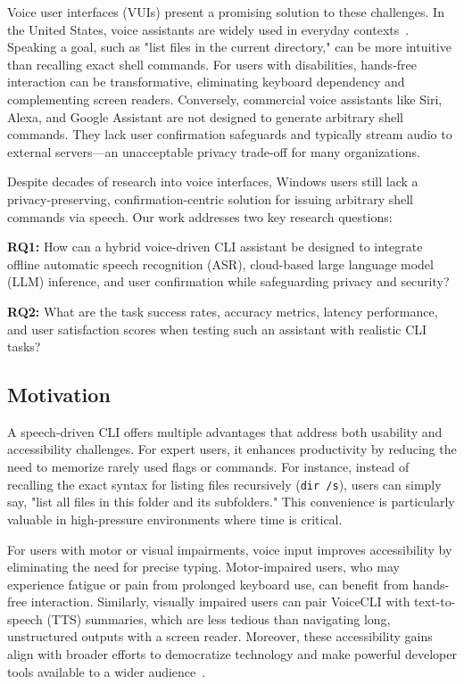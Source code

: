 \documentclass[a4paper,12pt]{article}
\begin{document}
Voice user interfaces (VUIs) present a promising solution to these challenges. In the United States, voice assistants are widely used in everyday contexts~\cite{ref8}. Speaking a goal, such as "list files in the current directory," can be more intuitive than recalling exact shell commands. For users with disabilities, hands-free interaction can be transformative, eliminating keyboard dependency and complementing screen readers. Conversely, commercial voice assistants like Siri, Alexa, and Google Assistant are not designed to generate arbitrary shell commands. They lack user confirmation safeguards and typically stream audio to external servers—an unacceptable privacy trade-off for many organizations.

Despite decades of research into voice interfaces, Windows users still lack a privacy-preserving, confirmation-centric solution for issuing arbitrary shell commands via speech. Our work addresses two key research questions:
\begin{description}
    \item\textbf{RQ1:} How can a hybrid voice-driven CLI assistant be designed to integrate offline automatic speech recognition (ASR), cloud-based large language model (LLM) inference, and user confirmation while safeguarding privacy and security?

    \item\textbf{RQ2:} What are the task success rates, accuracy metrics, latency performance, and user satisfaction scores when testing such an assistant with realistic CLI tasks?
\end{description}
\subsection{Motivation}

A speech-driven CLI offers multiple advantages that address both usability and accessibility challenges. For expert users, it enhances productivity by reducing the need to memorize rarely used flags or commands. For instance, instead of recalling the exact syntax for listing files recursively (\texttt{dir /s}), users can simply say, "list all files in this folder and its subfolders." This convenience is particularly valuable in high-pressure environments where time is critical.

For users with motor or visual impairments, voice input improves accessibility by eliminating the need for precise typing. Motor-impaired users, who may experience fatigue or pain from prolonged keyboard use, can benefit from hands-free interaction. Similarly, visually impaired users can pair VoiceCLI with text-to-speech (TTS) summaries, which are less tedious than navigating long, unstructured outputs with a screen reader. Moreover, these accessibility gains align with broader efforts to democratize technology and make powerful developer tools available to a wider audience~\cite{ref7}.
\end{document}
